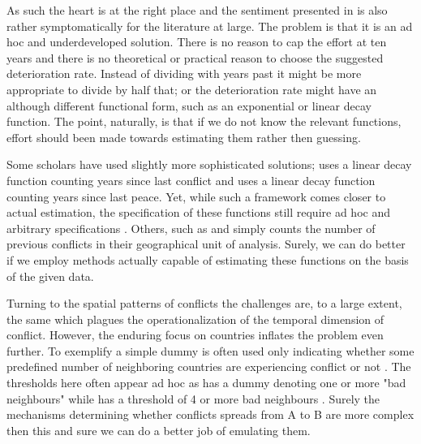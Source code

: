\documentclass[a4paper]{article}
\begin{document}
As such the heart is at the right place and the sentiment presented in \cite{perry_2013} is also rather symptomatically for the literature at large. The problem is that it is an ad hoc and underdeveloped solution. There is no reason to cap the effort at ten years and there is no theoretical or practical reason to choose the suggested deterioration rate. Instead of dividing with years past it might be more appropriate to divide by half that; or the deterioration rate might have an although different functional form, such as an exponential or linear decay function. The point, naturally, is that if we do not know the relevant functions, effort should been made towards estimating them rather then guessing.\par 

Some scholars have used slightly more sophisticated solutions; \cite{Collier_Hoeffler_2004} uses a linear decay function counting years since last conflict and \cite{Hegre_Sambanis_2006} uses a linear decay function counting years since last peace. Yet, while such a framework comes closer to actual estimation, the specification of these functions still require ad hoc and arbitrary specifications \cite[501]{Gelman_2013}. Others, such as \cite{Cederman_Gleditsch_Buhaug_2013} and \cite{Maase} simply counts the number of previous conflicts in their geographical unit of analysis. Surely, we can do better if we employ methods actually capable of estimating these functions on the basis of the given data.\par

Turning to the spatial patterns of conflicts the challenges are, to a large extent, the same which plagues the operationalization of the temporal dimension of conflict. However, the enduring focus on countries inflates the problem even further. To exemplify a simple dummy is often used only indicating whether some predefined number of neighboring countries are experiencing conflict or not \citep{Hegre_Sambanis_2006, Goldstone_2010}. The thresholds here often appear ad hoc as \cite{Hegre_Sambanis_2006} has a dummy denoting one or more "bad neighbours" \citep[521-522]{Hegre_Sambanis_2006} while \cite{Goldstone_2010} has a threshold of 4 or more bad neighbours \citep[197]{Goldstone_2010}. Surely the mechanisms determining whether conflicts spreads from A to B are more complex then this and sure we can do a better job of emulating them.\par 
\end{document}
